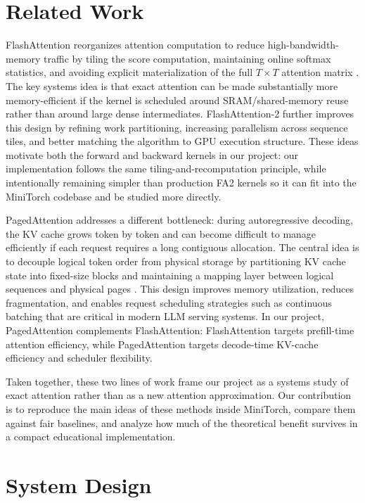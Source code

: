 \documentclass{article}
\begin{document}
\section{Related Work}

FlashAttention reorganizes attention computation to reduce high-bandwidth-memory traffic by tiling the score computation, maintaining online softmax statistics, and avoiding explicit materialization of the full $T \times T$ attention matrix \cite{dao2023flashattention2}. The key systems idea is that exact attention can be made substantially more memory-efficient if the kernel is scheduled around SRAM/shared-memory reuse rather than around large dense intermediates. FlashAttention-2 further improves this design by refining work partitioning, increasing parallelism across sequence tiles, and better matching the algorithm to GPU execution structure. These ideas motivate both the forward and backward kernels in our project: our implementation follows the same tiling-and-recomputation principle, while intentionally remaining simpler than production FA2 kernels so it can fit into the MiniTorch codebase and be studied more directly.

PagedAttention addresses a different bottleneck: during autoregressive decoding, the KV cache grows token by token and can become difficult to manage efficiently if each request requires a long contiguous allocation. The central idea is to decouple logical token order from physical storage by partitioning KV cache state into fixed-size blocks and maintaining a mapping layer between logical sequences and physical pages \cite{kwon2023pagedattention}. This design improves memory utilization, reduces fragmentation, and enables request scheduling strategies such as continuous batching that are critical in modern LLM serving systems. In our project, PagedAttention complements FlashAttention: FlashAttention targets prefill-time attention efficiency, while PagedAttention targets decode-time KV-cache efficiency and scheduler flexibility.

Taken together, these two lines of work frame our project as a systems study of exact attention rather than as a new attention approximation. Our contribution is to reproduce the main ideas of these methods inside MiniTorch, compare them against fair baselines, and analyze how much of the theoretical benefit survives in a compact educational implementation.

\section{System Design}
\end{document}
